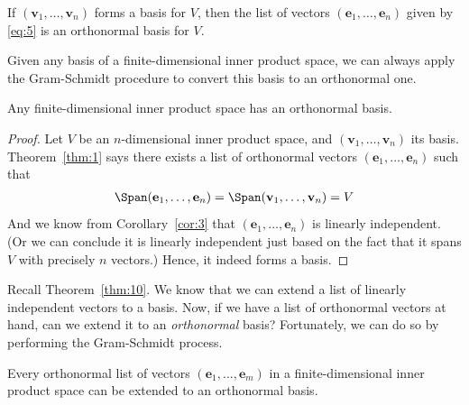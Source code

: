 \documentclass[thmcnt=section, color=blue, 12pt]{my-elegantbook}
\begin{document}
If $(\mathbf{v}_1, \ldots, \mathbf{v}_n)$ forms a basis for $V$, then the list of vectors $(\mathbf{e}_1, \ldots, \mathbf{e}_n)$ given by \eqref{eq:5} is an orthonormal basis for $V$.


Given any basis of a finite-dimensional inner product space, we can always apply the Gram-Schmidt procedure to convert this basis to an orthonormal one.

\begin{corollary} \label{cor:5}
    Any finite-dimensional inner product space has an orthonormal basis.
\end{corollary}

\begin{proof}
    Let $V$ be an $n$-dimensional inner product space, and $(\mathbf{v}_1, \ldots, \mathbf{v}_n)$ its basis. Theorem~\ref{thm:1} says there exists a list of orthonormal vectors $(\mathbf{e}_1, \ldots, \mathbf{e}_n)$ such that 
    \begin{align*}
        \Span (\mathbf{e}_1, \ldots, \mathbf{e}_n)
        = \Span (\mathbf{v}_1, \ldots, \mathbf{v}_n)
        = V
    \end{align*}
    And we know from Corollary~\ref{cor:3} that $(\mathbf{e}_1, \ldots, \mathbf{e}_n)$ is linearly independent. (Or we can conclude it is linearly independent just based on the fact that it spans $V$ with precisely $n$ vectors.) Hence, it indeed forms a basis.
\end{proof}


Recall Theorem~\ref{thm:10}. We know that we can extend a list of linearly independent vectors to a basis. Now, if we have a list of orthonormal vectors at hand, can we extend it to an \textit{orthonormal} basis? Fortunately, we can do so by performing the Gram-Schmidt process.

\begin{corollary} \label{cor:4}
    Every orthonormal list of vectors $(\mathbf{e}_1, \ldots, \mathbf{e}_m)$ in a finite-dimensional inner product space can be extended to an orthonormal basis.
\end{corollary}
\end{document}
